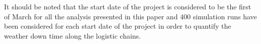 It should be noted that the start date of the project is considered to be the first of March for all the analysis presented in this paper and 400 simulation runs have been considered for each start date of the project in order to quantify the weather down time along the logistic chains. 